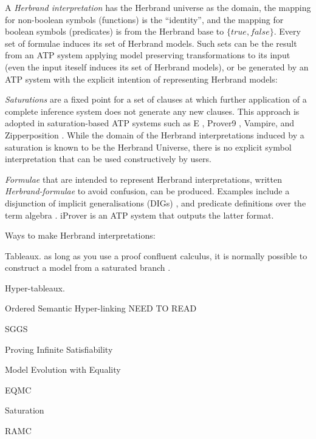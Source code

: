 \documentclass{easychair}
\newenvironment{packed_itemize}{
\vspace*{-0.3em}
\begin{itemize}
\setlength{\partopsep}{0pt}
\setlength{\itemsep}{1pt}
\setlength{\parskip}{0pt}
\setlength{\parsep}{0pt}
}{\end{itemize}}
\begin{document}
\vspace*{0.8em}
A {\em Herbrand interpretation} \cite{Her30} has the Herbrand universe as the domain, the mapping 
for non-boolean symbols (functions) is the ``identity'', and the mapping for boolean symbols 
(predicates) is from the Herbrand base to $\{true,false\}$.
Every set of formulae induces its set of Herbrand models.
Such sets can be the result from an ATP system applying model preserving transformations to its 
input (even the input iteself induces its set of Herbrand models), or be generated by an ATP 
system with the explicit intention of representing Herbrand models:
\begin{packed_itemize}
\item {\em Saturations} \cite{BG+01} are a fixed point for a set of clauses at which further 
      application of a complete inference system does not generate any new clauses.
      This approach is adopted in saturation-based ATP systems such as E \cite{SCV19},
      Prover9 \cite{McC-Prover9-URL}, Vampire, and Zipperposition \cite{VB+21}.
      While the domain of the Herbrand interpretations induced by a saturation is known 
      to be the Herbrand Universe, there is no explicit symbol interpretation that can be 
      used constructively by users.
\item {\em Formulae} that are intended to represent Herbrand interpretations, written 
      {\em Herbrand-formulae} to avoid confusion, can be produced.
      Examples include a disjunction of implicit generalisations (DIGs) \cite{LM87}, and 
      predicate definitions over the term algebra \cite{SK12}.
      iProver \cite{Kor08,SK12} is an ATP system that outputs the latter format.
\end{packed_itemize}

Ways to make Herbrand interpretations:
\begin{packed_itemize}
\item Tableaux. as long as you use a proof confluent calculus, it is normally possible to 
      construct a model from a saturated branch \cite{Hah01}.
\item Hyper-tableaux. \cite{BFN96,Bau98,BFP07}
\item Ordered Semantic Hyper-linking \cite{PZ00} NEED TO READ
\item SGGS \cite{BP16}
\item Proving Infinite Satisfiability \cite{BB13}
\item Model Evolution with Equality \cite{BT03,BFT04,BT05,BPT11}
\item EQMC \cite{CP00,Pel03-EQMC}
\item Saturation \cite{Pel03-JSC}
\item RAMC \cite{CZ92,CP95,CP95-TAB}
\end{packed_itemize}
\end{document}

